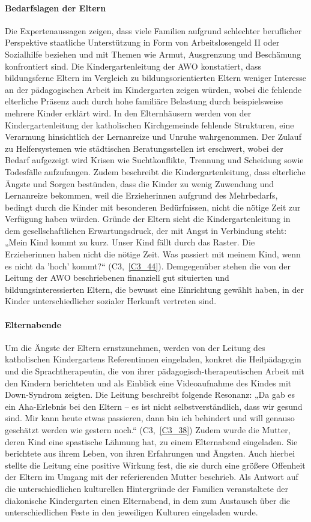 \paragraph{Bedarfslagen der Eltern}
Die Expertenaussagen zeigen, dass viele Familien aufgrund schlechter beruflicher Perspektive staatliche Unterstützung in Form von Arbeitslosengeld II oder Sozialhilfe beziehen und mit Themen wie Armut, Ausgrenzung und Beschämung konfrontiert sind. Die Kindergartenleitung der AWO konstatiert, dass bildungsferne Eltern im Vergleich zu bildungsorientierten Eltern weniger Interesse an der pädagogischen Arbeit im Kindergarten zeigen würden, wobei die fehlende elterliche Präsenz auch durch hohe familiäre Belastung durch beispielsweise mehrere Kinder erklärt wird.
In den Elternhäusern werden von der Kindergartenleitung der katholischen Kirchgemeinde fehlende Strukturen, eine Verarmung hinsichtlich der Lernanreize und Unruhe wahrgenommen. Der Zulauf zu Helfersystemen wie städtischen Beratungsstellen ist erschwert, wobei der Bedarf aufgezeigt wird Krisen wie Suchtkonflikte, Trennung und Scheidung sowie Todesfälle aufzufangen. 
Zudem beschreibt die Kindergartenleitung, dass elterliche Ängste und Sorgen bestünden, dass die Kinder zu wenig Zuwendung und Lernanreize bekommen, weil die Erzieherinnen aufgrund des Mehrbedarfs, bedingt durch die Kinder mit besonderen Bedürfnissen, nicht die nötige Zeit zur Verfügung haben würden. Gründe der Eltern sieht die Kindergartenleitung in dem gesellschaftlichen Erwartungsdruck, der mit Angst in Verbindung steht: „Mein Kind kommt zu kurz. Unser Kind fällt durch das Raster. Die Erzieherinnen haben nicht die nötige Zeit. Was passiert mit meinem Kind, wenn es nicht da 'hoch' kommt?“ (C3,~\ref{C3_44}). Demgegenüber stehen die von der Leitung der AWO beschriebenen finanziell gut situierten und bildungsinteressierten Eltern, die bewusst eine Einrichtung gewählt haben, in der Kinder unterschiedlicher sozialer Herkunft vertreten sind.

\paragraph{Elternabende}
Um die Ängste der Eltern ernstzunehmen, werden von der Leitung des katholischen Kindergartens Referentinnen eingeladen, konkret die Heilpädagogin und die Sprachtherapeutin, die von ihrer pädagogisch-therapeutischen Arbeit mit den Kindern berichteten und als Einblick eine Videoaufnahme des Kindes mit Down-Syndrom  zeigten. Die Leitung beschreibt folgende Resonanz: „Da gab es ein Aha-Erlebnis bei den Eltern -- es ist nicht selbstverständlich, dass wir gesund sind. Mir kann heute etwas passieren, dann bin ich behindert und will genauso geschätzt werden wie gestern noch.“ (C3,~\ref{C3_38}) Zudem wurde die Mutter, deren Kind eine spastische Lähmung hat, zu einem Elternabend eingeladen. Sie berichtete aus ihrem Leben, von ihren Erfahrungen und Ängsten. Auch hierbei stellte die Leitung eine positive Wirkung fest, die sie durch eine größere Offenheit der Eltern im Umgang mit der referierenden Mutter beschrieb. 
Als Antwort auf die unterschiedlichen kulturellen Hintergründe der Familien veranstaltete der diakonische Kindergarten einen Elternabend, in dem zum Austausch über die unterschiedlichen Feste in den jeweiligen Kulturen eingeladen wurde. 

